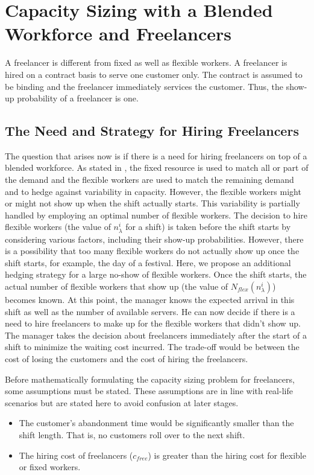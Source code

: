\chapter{Capacity Sizing with a Blended Workforce and Freelancers}

A freelancer is different from fixed as well as flexible workers. A freelancer is hired on a contract basis to serve one customer only. The contract is assumed to be binding and the freelancer immediately services the customer. Thus, the show-up probability of a freelancer is one.  \\

\section{The Need and Strategy for Hiring Freelancers} 
The question that arises now is if there is a need for hiring freelancers on top of a blended workforce. As stated in \cite{dong}, the fixed resource is used to match all or part of the demand and the flexible workers are used to match the remaining demand and to hedge against variability in capacity. However, the flexible workers might or might not show up when the shift actually starts. This variability is partially handled by employing an optimal number of flexible workers. The decision to hire flexible workers (the value of $n_{\lambda}^i$ for a shift) is taken before the shift starts by considering various factors, including their show-up probabilities. However, there is a possibility that too many flexible workers do not actually show up once the shift starts, for example, the day of a festival. Here, we propose an additional hedging strategy for a large no-show of flexible workers. Once the shift starts, the actual number of flexible workers that show up (the value of $N_{flex}(n_{\lambda}^i)$) becomes known. At this point, the manager knows the expected arrival in this shift as well as the number of available servers. He can now decide if there is a need to hire freelancers to make up for the flexible workers that didn't show up. The manager takes the decision about freelancers immediately after the start of a shift to minimize the waiting cost incurred. The trade-off would be between the cost of losing the customers and the cost of hiring the freelancers. 

\begin{remark}
Before mathematically formulating the capacity sizing problem for freelancers, some assumptions must be stated. These assumptions are in line with real-life scenarios but are stated here to avoid confusion at later stages.
\begin{itemize}
\itemsep0em
  \item The customer's abandonment time would be significantly smaller than the shift length. That is, no customers roll over to the next shift.
  \item The hiring cost of freelancers ($c_{free}$) is greater than the hiring cost for flexible or fixed workers. 
\end{itemize}
\end{remark}


